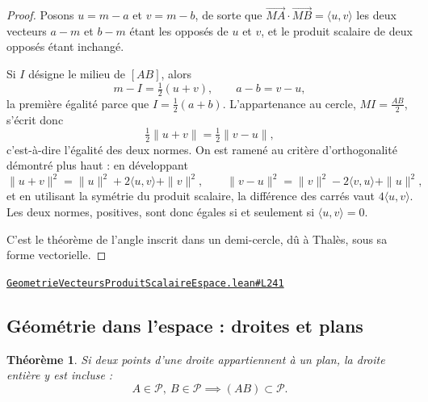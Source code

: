 \documentclass[11pt,a4paper]{article}
\theoremstyle{definition}
\theoremstyle{plain}
\newtheorem{theoreme}{Théorème}
\newcommand{\source}[2]{\par\smallskip\noindent\hfill{\footnotesize\href{#1}{\texttt{#2}}}\par\smallskip}
\begin{document}
\begin{proof}
Posons $u = m - a$ et $v = m - b$, de sorte que
$\overrightarrow{MA}\cdot\overrightarrow{MB} = \langle u, v\rangle$ \textemdash{} les deux
vecteurs $a - m$ et $b - m$ étant les opposés de $u$ et $v$, et le produit scalaire de deux
opposés étant inchangé.

Si $I$ désigne le milieu de $[AB]$, alors
\[ m - I = \tfrac{1}{2}(u + v) , \qquad a - b = v - u , \]
la première égalité parce que $I = \frac{1}{2}(a+b)$. L'appartenance au cercle,
$MI = \frac{AB}{2}$, s'écrit donc
\[ \tfrac{1}{2}\|u + v\| = \tfrac{1}{2}\|v - u\| , \]
c'est-à-dire l'égalité des deux normes. On est ramené au critère d'orthogonalité démontré
plus haut : en développant
\[ \|u+v\|^{2} = \|u\|^{2} + 2\langle u, v\rangle + \|v\|^{2} , \qquad
   \|v-u\|^{2} = \|v\|^{2} - 2\langle v, u\rangle + \|u\|^{2} , \]
et en utilisant la symétrie du produit scalaire, la différence des carrés vaut
$4\langle u, v\rangle$. Les deux normes, positives, sont donc égales si et seulement si
$\langle u, v\rangle = 0$.

\medskip\noindent
C'est le théorème de l'angle inscrit dans un demi-cercle, dû à Thalès, sous sa forme
vectorielle.
\end{proof}
\source{https://github.com/Commutator-IO/learn-lean/blob/main/cours/02-lycee/08-geometrie-vecteurs-produit-scalaire-espace/GeometrieVecteursProduitScalaireEspace.lean\#L241}{GeometrieVecteursProduitScalaireEspace.lean\#L241}

\subsection{Géométrie dans l'espace : droites et plans}

\begin{theoreme}
Si deux points d'une droite appartiennent à un plan, la droite entière y est incluse :
\[ A \in \mathcal{P},\ B \in \mathcal{P} \implies (AB) \subset \mathcal{P} . \]
\end{theoreme}
\end{document}
